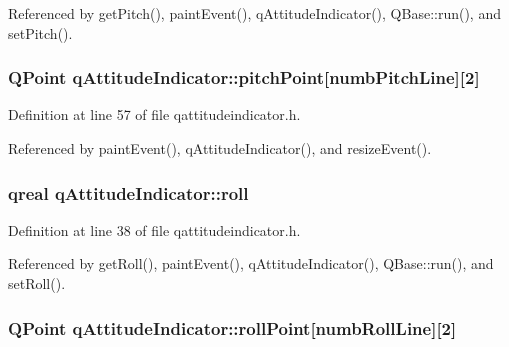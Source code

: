 Referenced by get\-Pitch(), paint\-Event(), q\-Attitude\-Indicator(), Q\-Base\-::run(), and set\-Pitch().

\hypertarget{classqAttitudeIndicator_a715b6a95898985f0f52ec6bf18010c9e}{
\subsubsection[{pitch\-Point}]{\setlength{\rightskip}{0pt plus 5cm}Q\-Point q\-Attitude\-Indicator\-::pitch\-Point\mbox{[}{\bf numb\-Pitch\-Line}\mbox{]}\mbox{[}2\mbox{]}\hspace{0.3cm}{\ttfamily [private]}}}\label{classqAttitudeIndicator_a715b6a95898985f0f52ec6bf18010c9e}


Definition at line 57 of file qattitudeindicator.\-h.



Referenced by paint\-Event(), q\-Attitude\-Indicator(), and resize\-Event().

\hypertarget{classqAttitudeIndicator_a10c98e2fd9195050cb305f4b12bf75bb}{
\subsubsection[{roll}]{\setlength{\rightskip}{0pt plus 5cm}qreal q\-Attitude\-Indicator\-::roll}}\label{classqAttitudeIndicator_a10c98e2fd9195050cb305f4b12bf75bb}


Definition at line 38 of file qattitudeindicator.\-h.



Referenced by get\-Roll(), paint\-Event(), q\-Attitude\-Indicator(), Q\-Base\-::run(), and set\-Roll().

\hypertarget{classqAttitudeIndicator_a739d71cc4dfba5d2fbb23186372c4fd4}{
\subsubsection[{roll\-Point}]{\setlength{\rightskip}{0pt plus 5cm}Q\-Point q\-Attitude\-Indicator\-::roll\-Point\mbox{[}{\bf numb\-Roll\-Line}\mbox{]}\mbox{[}2\mbox{]}\hspace{0.3cm}{\ttfamily [private]}}}\label{classqAttitudeIndicator_a739d71cc4dfba5d2fbb23186372c4fd4}


